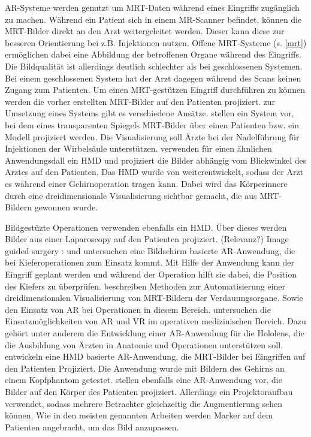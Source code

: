 AR-Systeme werden genutzt um MRT-Daten während eines Eingriffs zugänglich zu machen. Während ein Patient sich in einem MR-Scanner befindet, können die MRT-Bilder direkt an den Arzt weitergeleitet werden. Dieser kann diese zur besseren Orientierung bei z.B. Injektionen nutzen. Offene MRT-Systeme (s. \ref{mrt}) ermöglichen dabei eine Abbildung der betroffenen Organe während des Eingriffs. Die Bildqualität ist allerdings deutlich schlechter als bei geschlossenen Systemen. Bei einem geschlossenen System hat der Arzt dagegen während des Scans keinen Zugang zum Patienten. Um einen MRT-gestützen Eingriff durchführen zu können werden die vorher erstellten MRT-Bilder auf den Patienten projiziert. zur Umsetzung eines Systems gibt es verschiedene Ansätze.
\citet{Fritz2012} stellen ein System vor, bei dem eines transparenten Spiegels MRT-Bilder über einen Patienten bzw. ein Modell projiziert werden. Die Visualisierung soll Ärzte bei der Nadelführung für Injektionen der Wirbelsäule unterstützen. 
\citet{khamene03} verwenden für einen ähnlichen Anwendungsdall ein HMD und projiziert die Bilder abhängig vom Blickwinkel des Arztes auf den Patienten. Das HMD wurde von \citet{khamene01} weiterentwickelt, sodass der Arzt es während einer Gehirnoperation tragen kann. Dabei wird das Körperinnere durch eine dreidimensionale Visualisierung sichtbar gemacht, die aus MRT-Bildern gewonnen wurde. 

Bildgestüzte Operationen 
\citet{fuchs98} verwenden ebenfalls ein HMD. Über dieses werden Bilder aus einer Laparoscopy auf den Patienten projiziert. (Relevanz?)
Image guided surgery :\citet{grimson99} und  \citet{KerstenOertel2013TheSO}
\citet{MISCHKOWSKI2006478}
\citet{MISCHKOWSKI2006478} untersuchen eine Bildschirm basierte AR-Anwendung, die bei Kieferoperationen zum Einsatz kommt. Mit Hilfe der Anwendung kann der Eingriff geplant werden und während der Operation hilft sie dabei, die Position des Kiefers zu überprüfen. 
\citet{Soler04} beschreiben Methoden zur Automatisierung einer dreidimensionalen Visualisierung von MRT-Bildern der Verdauungsorgane. Sowie den Einsatz von AR bei Operationen in diesem Bereich. 
\citet{GasquesRodrigues17} untersuchen die Einsatzmöglichkeiten von AR und VR im operativen medizinischen Bereich. Dazu gehört unter anderem die Entwicklung einer AR-Anwendung für die Hololens, die die Ausbildung von Ärzten in Anatomie und Operationen unterstützen soll. 
\citet{Wendt03} entwickeln eine HMD basierte AR-Anwendung, die MRT-Bilder bei Eingriffen auf den Patienten Projiziert. Die Anwendung wurde mit Bildern des Gehirns an einem Kopfphantom getestet.
\citet{Watts17} stellen ebenfalls eine AR-Anwendung vor, die Bilder auf den Körper des Patienten projiziert. Allerdings ein Projektoraufbau verwendet, sodass mehrere Betrachter gleichzeitig die Augmentierung sehen können. Wie in den meisten genannten Arbeiten werden Marker auf dem Patienten angebracht, um das Bild anzupassen.
\citet{Tabrizi15}


